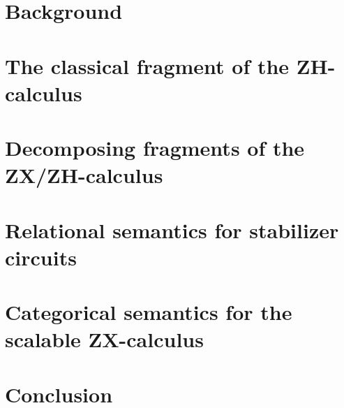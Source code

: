 \documentclass[12pt]{ociamthesis}  %
\begin{document}
\chapter{Background}


\chapter{The classical fragment of the ZH-calculus}


\chapter{Decomposing fragments of the ZX/ZH-calculus}


\chapter{Relational semantics for stabilizer circuits}


\chapter{Categorical semantics for the scalable ZX-calculus}

\chapter{Conclusion}


 

\end{document}
